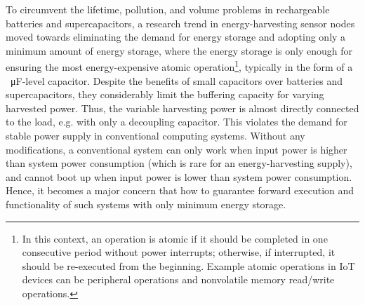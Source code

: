 
To circumvent the lifetime, pollution, and volume problems in rechargeable batteries and supercapacitors, a research trend in energy-harvesting sensor nodes moved towards eliminating the demand for energy storage and adopting only a minimum amount of energy storage, where the energy storage is only enough for ensuring the most energy-expensive atomic operation\footnote{In this context, an operation is atomic if it should be completed in one consecutive period without power interrupts; otherwise, if interrupted, it should be re-executed from the beginning. Example atomic operations in IoT devices can be peripheral operations and nonvolatile memory read/write operations.}, typically in the form of a \SI{}{\micro\farad}-level capacitor. 
Despite the benefits of small capacitors over batteries and supercapacitors, they considerably limit the buffering capacity for varying harvested power. 
Thus, the variable harvesting power is almost directly connected to the load, e.g. with only a decoupling capacitor. 
This violates the demand for stable power supply in conventional computing systems.
Without any modifications, a conventional system can only work when input power is higher than system power consumption (which is rare for an energy-harvesting supply), and cannot boot up when input power is lower than system power consumption. 
Hence, it becomes a major concern that how to guarantee forward execution and functionality of such systems with only minimum energy storage.


